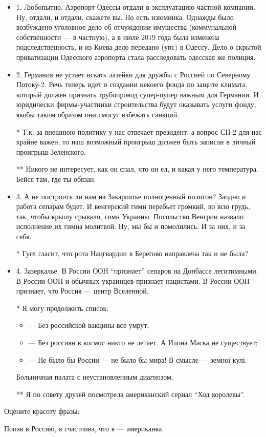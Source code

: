 \begin{itemize}

\item 1. Любопытно. Аэропорт Одессы отдали в эксплуатацию частной компании. Ну,
				отдали, и отдали, скажете вы. Но есть изюминка. Однажды было возбуждено
				уголовное дело об отчуждении имущества (коммунальной собственности --- в
				частную), а в июле 2019 года была изменена подследственность, и из
				Киева дело передано (упс) в Одессу. Дело о скрытой приватизации
				Одесского аэропорта стала расследовать одесская же полиция.

\item 2. Германия не устает искать лазейки для дружбы с Россией по Северному
				Потоку-2. Речь теперь идет о создании некоего фонда по защите климата,
				который должен признать трубопровод супер-пупер важным для Германии. И
				юридически фирмы-участники строительства будут оказывать услуги фонду,
				якобы таким образом они смогут избежать санкций.

* Т.к. за внешнюю политику у нас отвечает президент, а вопрос СП-2 для нас
крайне важен, то наш возможный проигрыш должен быть записан в личный проигрыш
Зеленского.

** Никого не интересует, как он спал, что он ел, и какая у него температура. Бейся там, где ты обязан.

\item 3. А не построить ли нам на Закарпатье полноценный полигон? Заодно и
				работа сепарам будет. И венгерский гимн перебьет громкий, во всю грудь,
				так, чтобы крышу срывало, гимн Украины. Посольство Венгрии назвало
				исполнение их гимна молитвой. Ну, мы бы и помолились. И за них, и за
				себя.


* Гугл гласит, что рота Нацгвардии в Берегово направлена так и не была?

\item 4. Зазеркалье. В России ООН \enquote{признает} сепаров на Донбассе легитимными. В
России ООН и обычных украинцев признает нацистами. В России ООН признает, что
Россия --- центр Вселенной.

* Я могу продолжить список:

\begin{itemize}
  \item --- Без российской вакцины все умрут;
  \item --- Без россиян в космос никто не летает. А Илона Маска не существует;
  \item --- Не было бы России --- не было бы мира! В смысле --- земної кулі.
\end{itemize}

Больничная палата с неустановленным диагнозом.

** Я по совету друзей посмотрела американский сериал \enquote{Ход королевы}.

\end{itemize}

Оцените красоту фразы:

Попав в Россию, я счастлива, что я --- американка.
